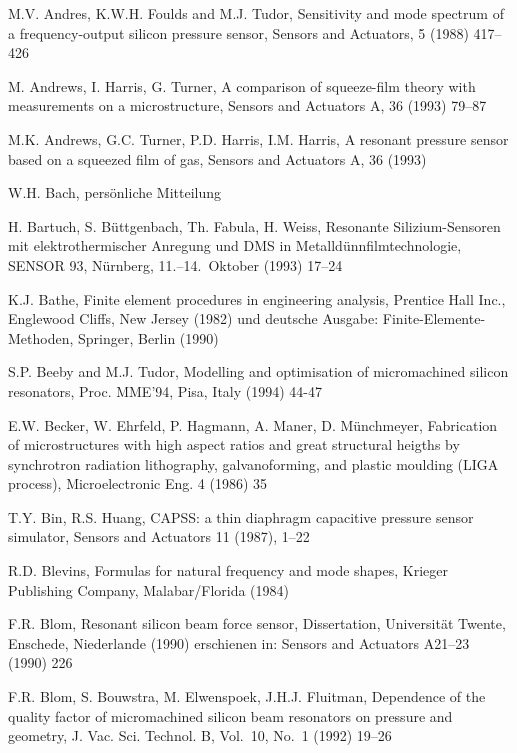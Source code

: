 \begin{thebibliography}{xxx}
 M.V. Andres, K.W.H. Foulds and M.J. Tudor,
 Sensitivity and mode spectrum of a frequency-output silicon pressure sensor,
 Sensors and Actuators, 5 (1988) 417--426

 M. Andrews, I. Harris, G. Turner, A comparison of squeeze-film theory with
 measurements on a microstructure, Sensors and Actuators A, 36 (1993) 79--87

 M.K. Andrews, G.C. Turner, P.D. Harris, I.M. Harris, A resonant pressure
 sensor based on a squeezed film of gas, Sensors and Actuators A, 36 (1993)

 W.H. Bach, persönliche Mitteilung

 H. Bartuch, S. Büttgenbach, Th. Fabula, H. Weiss,
 Resonante Silizium-Sensoren mit elektrothermischer Anregung und DMS in
 Metalldünnfilmtechnologie, SENSOR 93, Nürnberg, 11.--14.~Oktober (1993)
 17--24

 K.J. Bathe, Finite element procedures in engineering analysis, Prentice Hall
 Inc., Englewood Cliffs, New Jersey (1982) und deutsche Ausgabe:
 Finite-Elemente-Methoden, Springer, Berlin (1990)

 S.P. Beeby and M.J. Tudor, Modelling and optimisation of micromachined
 silicon resonators, Proc. MME'94, Pisa, Italy (1994) 44-47

 E.W. Becker, W. Ehrfeld, P. Hagmann, A. Maner, D. Münchmeyer, Fabrication of
 microstructures with high aspect ratios and great structural heigths by
 synchrotron radiation lithography, galvanoforming, and plastic moulding
 (LIGA process), Microelectronic Eng. 4 (1986) 35

 T.Y. Bin, R.S. Huang, {\sf CAPSS}: a thin diaphragm capacitive pressure
 sensor simulator, Sensors and Actuators 11 (1987), 1--22

 R.D. Blevins, Formulas for natural frequency and mode shapes,
 Krieger Publishing Company, Malabar/Florida (1984)

 F.R. Blom, Resonant silicon beam force sensor, Dissertation,
 Universität Twente, Enschede, Niederlande (1990)
 erschienen in: Sensors and Actuators A21--23 (1990) 226

 F.R. Blom, S. Bouwstra, M. Elwenspoek, J.H.J. Fluitman, Dependence of the
 quality factor of micromachined silicon beam resonators on pressure and
 geometry, J. Vac. Sci. Technol. B, Vol.~10, No.~1 (1992) 19--26


\end{thebibliography}
